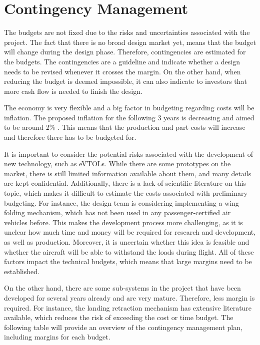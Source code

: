 \section{Contingency Management}
\label{sec:contingengy_mngmt}
The budgets are not fixed due to the risks and uncertainties associated with the project.
The fact that there is no broad design market yet, means that the budget will change during the design phase.
Therefore, contingencies are estimated for the budgets.
The contingencies are a guideline and indicate whether a design needs to be revised whenever it crosses the margin.
On the other hand, when reducing the budget is deemed impossible, it can also indicate to investors that more cash flow is needed to finish the design.

The economy is very flexible and a big factor in budgeting regarding costs will be inflation.
The proposed inflation for the following 3 years is decreasing and aimed to be around 2$\%$ \cite{ecb}.
This means that the production and part costs will increase and therefore there has to be budgeted for.


It is important to consider the potential risks associated with the development of new technology, such as eVTOLs. While there are some prototypes on the market, there is still limited information available about them, and many details are kept confidential.
Additionally, there is a lack of scientific literature on this topic, which makes it difficult to estimate the costs associated with preliminary budgeting.
For instance, the design team is considering implementing a wing folding mechanism, which has not been used in any passenger-certified air vehicles before.
This makes the development process more challenging, as it is unclear how much time and money will be required for research and development, as well as production.
Moreover, it is uncertain whether this idea is feasible and whether the aircraft will be able to withstand the loads during flight.
All of these factors impact the technical budgets, which means that large margins need to be established.


On the other hand, there are some sub-systems in the project that have been developed for several years already and are very mature.
Therefore, less margin is required.
For instance, the landing retraction mechanism has extensive literature available, which reduces the risk of exceeding the cost or time budget.
The following table will provide an overview of the contingency management plan, including margins for each budget.

